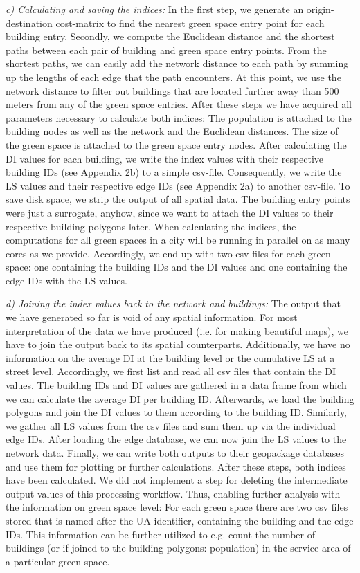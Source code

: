 \documentclass[10pt]{article}
\begin{document}
\textit{c) Calculating and saving the indices:} In the first step, we generate an origin-destination cost-matrix to find the nearest green space entry point for each building entry. Secondly, we compute the Euclidean distance and the shortest paths between each pair of building and green space entry points. From the shortest paths, we can easily add the network distance to each path by summing up the lengths of each edge that the path encounters. At this point, we use the network distance to filter out buildings that are located further away than 500 meters from any of the green space entries. After these steps we have acquired all parameters necessary to calculate both indices: The population is attached to the building nodes as well as the network and the Euclidean distances. The size of the green space is attached to the green space entry nodes. After calculating the DI values for each building, we write the index values with their respective building IDs (see Appendix 2b) to a simple csv-file. Consequently, we write the LS values and their respective edge IDs (see Appendix 2a) to another csv-file. To save disk space, we strip the output of all spatial data. The building entry points were just a surrogate, anyhow, since we want to attach the DI values to their respective building polygons later. When calculating the indices, the computations for all green spaces in a city will be running in parallel on as many cores as we provide. Accordingly, we end up with two csv-files for each green space: one containing the building IDs and the DI values and one containing the edge IDs with the LS values.

\textit{d) Joining the index values back to the network and buildings:} The output that we have generated so far is void of any spatial information. For most interpretation of the data we have produced (i.e. for making beautiful maps), we have to join the output back to its spatial counterparts. Additionally, we have no information on the average DI at the building level or the cumulative LS at a street level. Accordingly, we first list and read all csv files that contain the DI values. The building IDs and DI values are gathered in a data frame from which we can calculate the average DI per building ID. Afterwards, we load the building polygons and join the DI values to them according to the building ID.  Similarly, we gather all LS values from the csv files and sum them up via the individual edge IDs. After loading the edge database, we can now join the LS values to the network data. Finally, we can write both outputs to their geopackage databases and use them for plotting or further calculations. 
After these steps, both indices have been calculated. We did not implement a step for deleting the intermediate output values of this processing workflow. Thus, enabling further analysis with the information on green space level: For each green space there are two csv files stored that is named after the UA identifier, containing the building and the edge IDs. This information can be further utilized to e.g. count the number of buildings (or if joined to the building polygons: population) in the service area of a particular green space.
\end{document}
